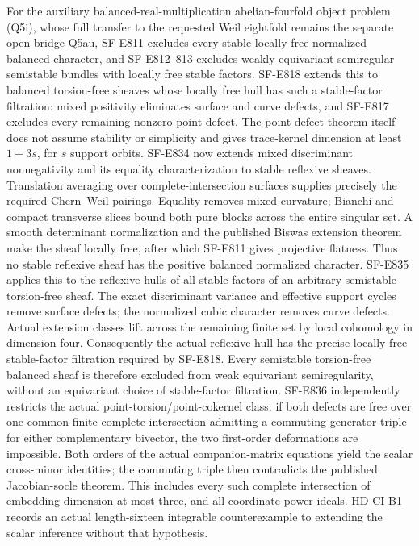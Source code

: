\documentclass[11pt]{article}
\theoremstyle{remark}\newtheorem{remark}[theorem]{Remark}
\begin{document}
For the auxiliary balanced-real-multiplication abelian-fourfold object problem (Q5i), whose full transfer to the requested Weil eightfold remains the separate open bridge Q5au,
SF-E811 excludes every stable locally free normalized balanced character,
and SF-E812--813 excludes weakly equivariant semiregular semistable
bundles with locally free stable factors. SF-E818 extends this to
balanced torsion-free sheaves whose locally free hull has such a
stable-factor filtration: mixed positivity eliminates surface and curve
defects, and SF-E817 excludes every remaining nonzero point defect.
The point-defect theorem itself does not assume stability or simplicity
and gives trace-kernel dimension at least $1+3s$, for $s$ support orbits.
SF-E834 now extends mixed discriminant nonnegativity and its equality
characterization to stable reflexive sheaves. Translation averaging
over complete-intersection surfaces supplies precisely the required
Chern--Weil pairings. Equality removes mixed curvature; Bianchi and
compact transverse slices bound both pure blocks across the entire
singular set. A smooth determinant normalization and the published
Biswas extension theorem make the sheaf locally free, after which
SF-E811 gives projective flatness. Thus no stable reflexive sheaf has
the positive balanced normalized character.
SF-E835 applies this to the reflexive hulls of all stable factors of
an arbitrary semistable torsion-free sheaf. The exact discriminant
variance and effective support cycles remove surface defects; the
normalized cubic character removes curve defects. Actual extension
classes lift across the remaining finite set by local cohomology in
dimension four. Consequently the actual reflexive hull has the precise
locally free stable-factor filtration required by SF-E818.
Every semistable torsion-free balanced sheaf is therefore excluded
from weak equivariant semiregularity, without an equivariant choice
of stable-factor filtration.
SF-E836 independently restricts the actual point-torsion/point-cokernel
class: if both defects are free over one common finite complete
intersection admitting a commuting generator triple for either
complementary bivector, the two first-order deformations are impossible.
Both orders of the actual companion-matrix equations yield the scalar
cross-minor identities; the commuting triple then contradicts the
published Jacobian-socle theorem. This includes every such complete
intersection of embedding dimension at most three, and all coordinate
power ideals. HD-CI-B1 records an actual length-sixteen integrable
counterexample to extending the scalar inference without that hypothesis.
\end{document}
